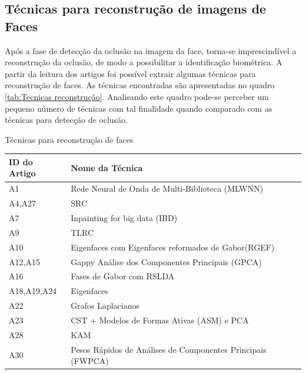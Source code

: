 \begin{quadro}[H]
\begin{tabular}{p{1.2in} p{4.2in} }
 \hline
		
		\end{tabular}
	\label{tab:Tecnicas deteccao}
\end{quadro}

	


\subsection{Técnicas para reconstrução de imagens de Faces}
\label{sub:reconstrução de faces}

Após a fase de detecção da oclusão na imagem da face, torna-se imprescindível a reconstrução da oclusão, de modo a possibilitar a identificação biométrica. A partir da leitura dos artigos foi possível extrair algumas técnicas para reconstrução de faces. As técnicas encontradas são apresentadas no quadro \ref{tab:Tecnicas reconstrução}. Analisando este quadro pode-se perceber um pequeno número de técnicas com tal finalidade quando comparado com as técnicas para detecção de oclusão. 


\begin{quadro}[H]
	\centering
	\caption{Técnicas para reconstrução de faces}
		\begin{tabular}{p{1.1in} p{4.4in} } \hline

		ID do Artigo & Nome da Técnica\\ \hline
  
A1 & Rede Neural de Onda de Multi-Biblioteca (MLWNN) \nomenclature{MLWNN}{Multi Library Wavelet Neural Network} \\
A4,A27 & SRC\\
A7 & Inpainting for big data (IBD) \nomenclature{IBD}{Inpainting for Big Data}\\
A9 & TLRC\\
A10 & Eigenfaces com Eigenfaces reformados de Gabor(RGEF)\nomenclature{RGEF}{Reformed Gabor Eigen Faces} \\
A12,A15 & Gappy Análise dos Componentes Principais (GPCA) \nomenclature{GPCA}{Gappy Principal Component Analysis} \\
A16 & Fases de Gabor com RSLDA\\
A18,A19,A24 & Eigenfaces \nomenclature{PCA}{Principal Component Analysis} \\
A22 & Grafos Laplacianos\\
A23 & CST + Modelos de Formas Ativas (ASM) \nomenclature{ASM}{Active Shape Model} e PCA\\
A28 & KAM \\
A30 & Pesos Rápidos de Análises de Componentes Principais (FWPCA) \nomenclature{FWPCA}{Fast-Weighted Principal Component Analysis}\\
                
 \hline
		\end{tabular}
	\label{tab:Tecnicas reconstrução}
\end{quadro}



